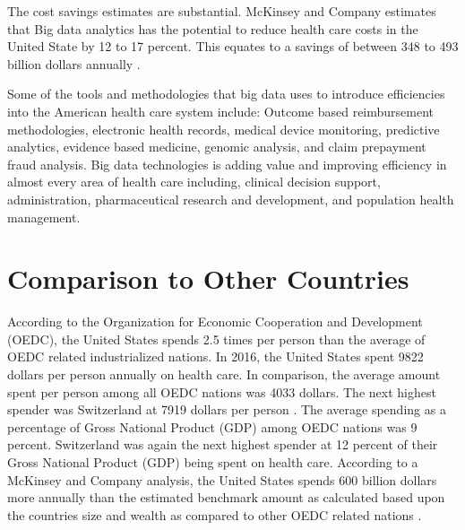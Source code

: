 \documentclass[sigconf]{acmart}
\begin{document}
The cost savings estimates are substantial. McKinsey and Company estimates that Big data analytics has the potential to reduce health care costs in the United State by 12 to 17 percent. This equates to a savings of between 348 to 493 billion dollars annually \cite{www-google-CIO}. 

Some of the tools and methodologies that big data uses to introduce efficiencies into the American health care system include:  Outcome based reimbursement methodologies, electronic health records, medical device monitoring, predictive analytics, evidence based medicine, genomic analysis, and claim prepayment fraud analysis.  Big data technologies is adding value and improving efficiency in almost every area of health care including, clinical decision support, administration, pharmaceutical research and development, and population health management. 
 


\section{Comparison to Other Countries}
According to the Organization for Economic Cooperation and Development (OEDC), the United States spends 2.5 times per person than the average of OEDC related industrialized nations.  In 2016, the United States spent 9822 dollars per person annually on health care.  In comparison, the average amount spent per person among all OEDC nations was 4033 dollars.  The next highest spender was Switzerland at 7919 dollars per person \cite{OEDC}. The average spending as a percentage of Gross National Product (GDP) among OEDC nations was 9 percent. Switzerland was again the next highest spender at 12 percent of their Gross National Product (GDP) being spent on health care.  According to a McKinsey and Company analysis, the United States spends 600 billion dollars more annually than the estimated benchmark amount as calculated based upon the countries size and wealth as compared to other OEDC related nations \cite{www-google-McKinsey}.
\end{document}
